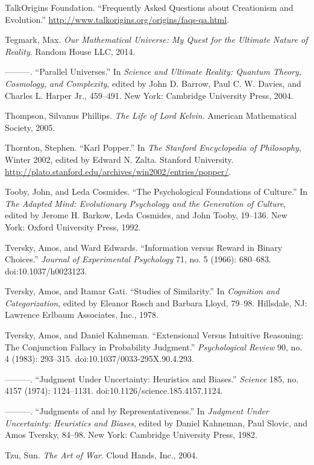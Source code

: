 \documentclass[letterpaper]{book}
\begin{document}
{
 TalkOrigins Foundation. ``Frequently Asked
Questions about Creationism and Evolution.''
\url{http://www.talkorigins.org/origins/faqs-qa.html}.}

{
 Tegmark, Max. \textit{Our Mathematical Universe: My Quest for the
Ultimate Nature of Reality}. Random House LLC, 2014.}

{
 {}---{}---{}---. ``Parallel
Universes.'' In \textit{Science and Ultimate Reality:
Quantum Theory, Cosmology, and Complexity}, edited by John D. Barrow,
Paul C. W. Davies, and Charles L. Harper Jr., 459--491. New York:
Cambridge University Press, 2004.}

{
 Thompson, Silvanus Phillips. \textit{The Life of Lord Kelvin}.
American Mathematical Society, 2005.}

{
 Thornton, Stephen. ``Karl
Popper.'' In \textit{The Stanford Encyclopedia of
Philosophy}, Winter 2002, edited by Edward N. Zalta. Stanford
University.
\url{http://plato.stanford.edu/archives/win2002/entries/popper/}.}

{
 Tooby, John, and Leda Cosmides. ``The
Psychological Foundations of Culture.'' In
\textit{The Adapted Mind: Evolutionary Psychology and the Generation of
Culture}, edited by Jerome H. Barkow, Leda Cosmides, and John Tooby,
19--136. New York: Oxford University Press, 1992.}

{
 Tversky, Amos, and Ward Edwards. ``Information
versus Reward in Binary Choices.'' \textit{Journal of
Experimental Psychology} 71, no. 5 (1966): 680--683.
doi:10.1037/h0023123.}

{
 Tversky, Amos, and Itamar Gati. ``Studies of
Similarity.'' In \textit{Cognition and
Categorization}, edited by Eleanor Rosch and Barbara Lloyd, 79--98.
Hillsdale, NJ: Lawrence Erlbaum Associates, Inc., 1978.}

{
 Tversky, Amos, and Daniel Kahneman. ``Extensional
Versus Intuitive Reasoning: The Conjunction Fallacy in Probability
Judgment.'' \textit{Psychological Review} 90, no. 4
(1983): 293--315. doi:10.1037/0033-295X.90.4.293.}

{
 {}---{}---{}---. ``Judgment Under Uncertainty:
Heuristics and Biases.'' \textit{Science} 185, no.
4157 (1974): 1124--1131. doi:10.1126/science.185.4157.1124.}

{
 {}---{}---{}---. ``Judgments of and by
Representativeness.'' In \textit{Judgment Under
Uncertainty: Heuristics and Biases}, edited by Daniel Kahneman, Paul
Slovic, and Amos Tversky, 84--98. New York: Cambridge University Press,
1982.}

{
 Tzu, Sun. \textit{The Art of War}. Cloud Hands, Inc., 2004.}
\end{document}
